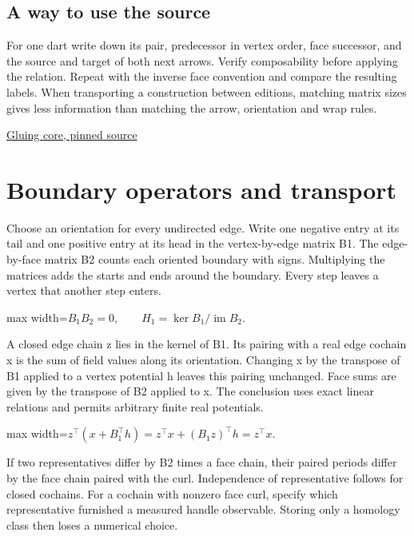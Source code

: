 \documentclass[11pt,oneside,openany]{book}
\begin{document}
\section*{A way to use the source}
For one dart write down its pair, predecessor in vertex order, face successor, and the source and target of both next arrows. Verify composability before applying the relation. Repeat with the inverse face convention and compare the resulting labels. When transporting a construction between editions, matching matrix sizes gives less information than matching the arrow, orientation and wrap rules.

{\small\sffamily\href{https://github.com/amelie-iska/GRH-research/blob/e941b50772fb5aff322644badfbe9fb260b4d46c/papers/dessin-gluing-core.tex}{Gluing core, pinned source}\par}
\chapter{Boundary operators and transport}
Choose an orientation for every undirected edge. Write one negative entry at its tail and one positive entry at its head in the vertex-by-edge matrix B1. The edge-by-face matrix B2 counts each oriented boundary with signs. Multiplying the matrices adds the starts and ends around the boundary. Every step leaves a vertex that another step enters.

\begin{center}\begin{adjustbox}{max width=\linewidth}$\displaystyle B_1B_2=0,\qquad H_1=\ker B_1/\operatorname{im}B_2.$\end{adjustbox}\end{center}
A closed edge chain z lies in the kernel of B1. Its pairing with a real edge cochain x is the sum of field values along its orientation. Changing x by the transpose of B1 applied to a vertex potential h leaves this pairing unchanged. Face sums are given by the transpose of B2 applied to x. The conclusion uses exact linear relations and permits arbitrary finite real potentials.

\begin{center}\begin{adjustbox}{max width=\linewidth}$\displaystyle z^\top(x+B_1^\top h)=z^\top x+(B_1z)^\top h=z^\top x.$\end{adjustbox}\end{center}
If two representatives differ by B2 times a face chain, their paired periods differ by the face chain paired with the curl. Independence of representative follows for closed cochains. For a cochain with nonzero face curl, specify which representative furnished a measured handle observable. Storing only a homology class then loses a numerical choice.
\end{document}
